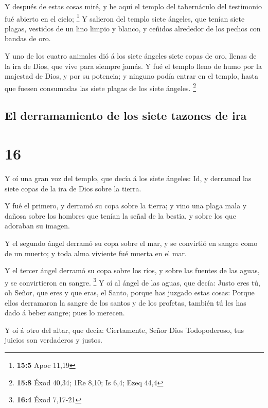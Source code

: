  Y después de estas cosas miré, y he aquí el templo del
tabernáculo del testimonio fué abierto en el cielo; \footnote{\textbf{15:5}
  Apoc 11,19}  Y salieron del templo siete ángeles, que
tenían siete plagas, vestidos de un lino limpio y blanco, y ceñidos
alrededor de los pechos con bandas de oro.

 Y uno de los cuatro animales dió á los siete ángeles
siete copas de oro, llenas de la ira de Dios, que vive para siempre
jamás.  Y fué el templo lleno de humo por la majestad de
Dios, y por su potencia; y ninguno podía entrar en el templo, hasta que
fuesen consumadas las siete plagas de los siete ángeles. \footnote{\textbf{15:8}
  Éxod 40,34; 1Re 8,10; Is 6,4; Ezeq 44,4}

\hypertarget{el-derramamiento-de-los-siete-tazones-de-ira}{%
\subsection{El derramamiento de los siete tazones de
ira}\label{el-derramamiento-de-los-siete-tazones-de-ira}}

\hypertarget{section-15}{%
\section{16}\label{section-15}}

 Y oí una gran voz del templo, que decía á los siete
ángeles: Id, y derramad las siete copas de la ira de Dios sobre la
tierra.

 Y fué el primero, y derramó su copa sobre la tierra; y
vino una plaga mala y dañosa sobre los hombres que tenían la señal de la
bestia, y sobre los que adoraban su imagen.

 Y el segundo ángel derramó su copa sobre el mar, y se
convirtió en sangre como de un muerto; y toda alma viviente fué muerta
en el mar.

 Y el tercer ángel derramó su copa sobre los ríos, y sobre
las fuentes de las aguas, y se convirtieron en sangre. \footnote{\textbf{16:4}
  Éxod 7,17-21}  Y oí al ángel de las aguas, que decía:
Justo eres tú, oh Señor, que eres y que eras, el Santo, porque has
juzgado estas cosas:  Porque ellos derramaron la sangre de
los santos y de los profetas, también tú les has dado á beber sangre;
pues lo merecen.

 Y oí á otro del altar, que decía: Ciertamente, Señor Dios
Todopoderoso, tus juicios son verdaderos y justos.

